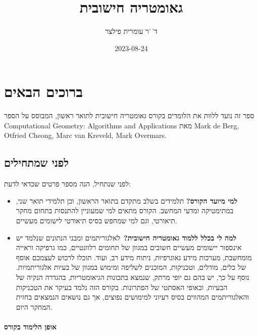 \documentclass[
]{book}
\title{גאומטריה חישובית}
\author{ד'\,'ר עומרית פילצר}
\date{2023-08-24}
\begin{document}
\maketitle

{
\setcounter{tocdepth}{1}
\tableofcontents
}
\hypertarget{before-we-start}{%
\chapter*{ברוכים הבאים}\label{before-we-start}}

ספר זה נועד ללוות את הלומדים בקורס גאומטריה חישובית לתואר ראשון, המבוסס על הספר Computational Geometry: Algorithms and Applications מאת
Mark de Berg, Otfried Cheong, Marc van Kreveld, Mark Overmars.

\hypertarget{welcome}{%
\section*{לפני שמתחילים}\label{welcome}}

לפני שנתחיל, הנה מספר פרטים שכדאי לדעת:

\begin{itemize}
\item
  \textbf{למי מיועד הקורס?} תלמידים בשלב מתקדם בתואר הראשון, וכן תלמידי תואר שני, במתימטיקה ומדעי המחשב. הקורס מתאים למי שמעוניין להתנסות בתחום מחקר תיאורטי, וגם למי שמחפש בסיס תיאורטי לישומים מעשיים.
\item
  \textbf{למה לי בכלל ללמוד גאומטריה חישובית?}~לאלגוריתמים ומבני הנתונים שנלמד יש אינספור יישומים מעשיים חשובים במגוון של תחומים רלוונטיים, כמו גרפיקה וראייה מומחשבת, מערכות מידע גאוגרפיות, ניתוח מידע רב, ועוד. תוכלו לרכוש לעצמכם אוסף של כלים, מודלים, וטכניקות, המוכנים לשליפה ומימוש במגוון של בעיות אלגוריתמיות. נוסף על כך, יש בהם גם יופי מרתק, שנמצא בתכונות הגיאומטריות, בהגדרה הנקיה של הבעיות, ובאופי האסתטי של הפתרונות. בקורס הזה נלמד בעיקר את הטכניקות והאלגוריתמים המהווים בסיס רעיוני למימושים נפוצים, אך גם נושאים הנמצאים בחזית המחקר היום.
\end{itemize}

\hypertarget{ux5d0ux5d5ux5e4ux5df-ux5d4ux5dcux5d9ux5deux5d5ux5d3-ux5d1ux5e7ux5d5ux5e8ux5e1}{%
\subsubsection*{אופן הלימוד בקורס}\label{ux5d0ux5d5ux5e4ux5df-ux5d4ux5dcux5d9ux5deux5d5ux5d3-ux5d1ux5e7ux5d5ux5e8ux5e1}}
\end{document}
